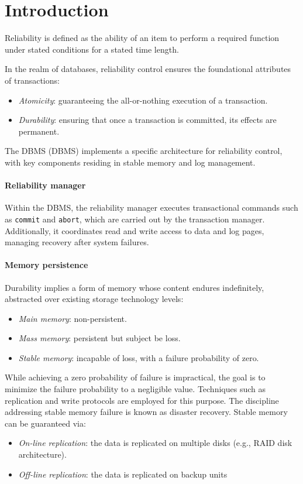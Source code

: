 \section{Introduction}

\begin{definition}
    Reliability is defined as the ability of an item to perform a required function under stated conditions for a stated time length.
\end{definition}
In the realm of databases, reliability control ensures the foundational attributes of transactions:
\begin{itemize}
    \item \textit{Atomicity}: guaranteeing the all-or-nothing execution of a transaction.
    \item \textit{Durability}: ensuring that once a transaction is committed, its effects are permanent.
\end{itemize}
The DBMS (DBMS) implements a specific architecture for reliability control, with key components residing in stable memory and log management.

\paragraph*{Reliability manager}
Within the DBMS, the reliability manager executes transactional commands such as \texttt{commit} and \texttt{abort}, which are carried out by the transaction manager. 
Additionally, it coordinates read and write access to data and log pages, managing recovery after system failures.

\paragraph*{Memory persistence}
Durability implies a form of memory whose content endures indefinitely, abstracted over existing storage technology levels:
\begin{itemize}
    \item \textit{Main memory}: non-persistent.
    \item \textit{Mass memory}: persistent but subject be loss.
    \item \textit{Stable memory}: incapable of loss, with a failure probability of zero.
\end{itemize}
While achieving a zero probability of failure is impractical, the goal is to minimize the failure probability to a negligible value. 
Techniques such as replication and write protocols are employed for this purpose. 
The discipline addressing stable memory failure is known as disaster recovery.
Stable memory can be guaranteed via:
\begin{itemize}
    \item \textit{On-line replication}: the data is replicated on multiple disks (e.g., RAID disk architecture).
    \item \textit{Off-line replication}: the data is replicated on backup units
\end{itemize}

